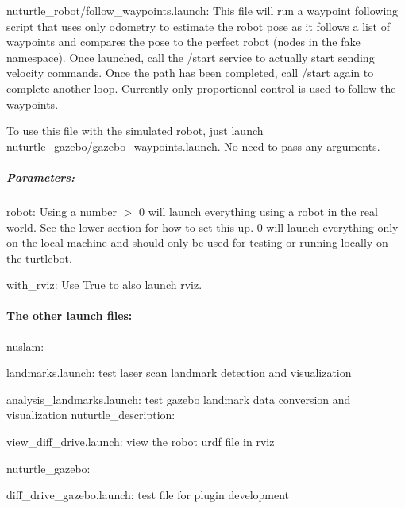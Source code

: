 {\ttfamily nuturtle\+\_\+robot/follow\+\_\+waypoints.\+launch}\+: This file will run a waypoint following script that uses only odometry to estimate the robot pose as it follows a list of waypoints and compares the pose to the \textquotesingle{}perfect\textquotesingle{} robot (nodes in the {\ttfamily fake} namespace). Once launched, call the {\ttfamily /start} service to actually start sending velocity commands. Once the path has been completed, call {\ttfamily /start} again to complete another loop. Currently only proportional control is used to follow the waypoints.

To use this file with the simulated robot, just launch {\ttfamily nuturtle\+\_\+gazebo/gazebo\+\_\+waypoints.\+launch}. No need to pass any arguments.

\subparagraph*{Parameters\+:}


\begin{DoxyItemize}
\item robot\+: Using a number $>$ 0 will launch everything using a robot in the real world. See the lower section for how to set this up. 0 will launch everything only on the local machine and should only be used for testing or running locally on the turtlebot.
\item with\+\_\+rviz\+: Use True to also launch rviz.
\end{DoxyItemize}

\paragraph*{The other launch files\+:}

{\ttfamily nuslam}\+:
\begin{DoxyItemize}
\item {\ttfamily landmarks.\+launch}\+: test laser scan landmark detection and visualization
\item {\ttfamily analysis\+\_\+landmarks.\+launch}\+: test gazebo landmark data conversion and visualization {\ttfamily nuturtle\+\_\+description}\+:
\item {\ttfamily view\+\_\+diff\+\_\+drive.\+launch}\+: view the robot urdf file in rviz
\end{DoxyItemize}

{\ttfamily nuturtle\+\_\+gazebo}\+:
\begin{DoxyItemize}
\item {\ttfamily diff\+\_\+drive\+\_\+gazebo.\+launch}\+: test file for plugin development
\end{DoxyItemize}


